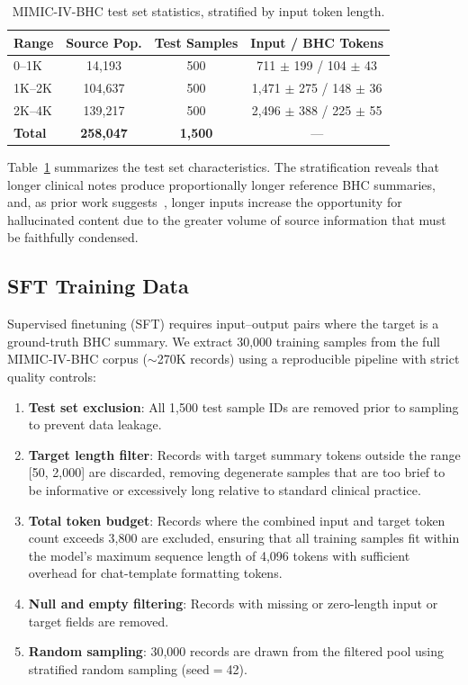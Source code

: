 \documentclass[12pt,a4paper,oneside]{report}
\begin{document}
\begin{table}[htbp]
\centering
\caption{MIMIC-IV-BHC test set statistics, stratified by input token length.}
\label{tab:test-set}
\begin{tabular}{lccc}
\toprule
\textbf{Range} & \textbf{Source Pop.} & \textbf{Test Samples} & \textbf{Input / BHC Tokens} \\
\midrule
0--1K   & 14,193  & 500 & 711 $\pm$ 199 / 104 $\pm$ 43 \\
1K--2K  & 104,637 & 500 & 1,471 $\pm$ 275 / 148 $\pm$ 36 \\
2K--4K  & 139,217 & 500 & 2,496 $\pm$ 388 / 225 $\pm$ 55 \\
\midrule
\textbf{Total} & \textbf{258,047} & \textbf{1,500} & --- \\
\bottomrule
\end{tabular}
\end{table}

Table~\ref{tab:test-set} summarizes the test set characteristics. The stratification reveals that longer clinical notes produce proportionally longer reference BHC summaries, and, as prior work suggests~\cite{aali2024mimic, vanveen2024clinical}, longer inputs increase the opportunity for hallucinated content due to the greater volume of source information that must be faithfully condensed.


\subsection{SFT Training Data}
\label{subsec:sft-data}

Supervised finetuning (SFT) requires input--output pairs where the target is a ground-truth BHC summary. We extract 30,000 training samples from the full MIMIC-IV-BHC corpus ($\sim$270K records) using a reproducible pipeline with strict quality controls:

\begin{enumerate}
    \item \textbf{Test set exclusion}: All 1,500 test sample IDs are removed prior to sampling to prevent data leakage.
    \item \textbf{Target length filter}: Records with target summary tokens outside the range [50, 2,000] are discarded, removing degenerate samples that are too brief to be informative or excessively long relative to standard clinical practice.
    \item \textbf{Total token budget}: Records where the combined input and target token count exceeds 3,800 are excluded, ensuring that all training samples fit within the model's maximum sequence length of 4,096 tokens with sufficient overhead for chat-template formatting tokens.
    \item \textbf{Null and empty filtering}: Records with missing or zero-length input or target fields are removed.
    \item \textbf{Random sampling}: 30,000 records are drawn from the filtered pool using stratified random sampling (seed$=$42).
\end{enumerate}
\end{document}
